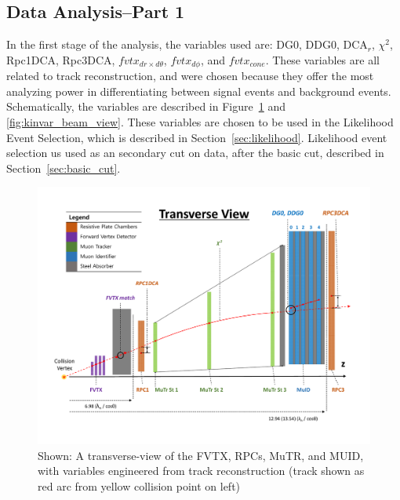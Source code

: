 \subsection{Data Analysis--Part 1}

In the first stage of the analysis, the variables used are: DG0, DDG0, DCA$_r$,
$\chi^2$, Rpc1DCA, Rpc3DCA, $fvtx_{dr \times d\theta}$, $fvtx_{d\phi}$, and
$fvtx_{cone}$. These variables are all related to track reconstruction, and were
chosen because they offer the most analyzing power in differentiating between
signal events and background events. Schematically, the variables are described
in Figure~\ref{fig:kinvar_side_view} and \ref{fig:kinvar_beam_view}. These
variables are chosen to be used in the Likelihood Event Selection, which is
described in Section~\ref{sec:likelihood}. Likelihood event selection us used as
an secondary cut on data, after the basic cut, described in
Section~\ref{sec:basic_cut}.

\begin{figure}[ht]
  \centering
  \includegraphics[width=\textwidth]{./figures/kinvar_side_view.pdf}
  \caption{
    Shown: A transverse-view of the FVTX, RPCs, MuTR, and MUID, with
    variables engineered from track reconstruction (track shown as red arc from
    yellow collision point on left)~\cite{Kim2016}
  }
  \label{fig:kinvar_side_view}
\end{figure}
    

